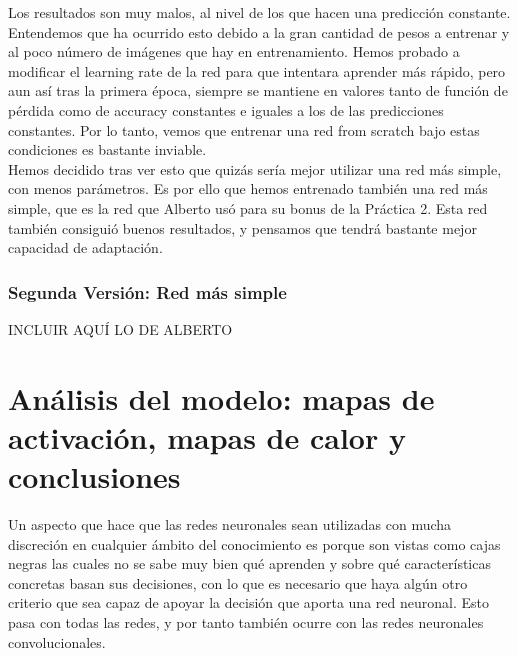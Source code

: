\documentclass[11pt,a4paper]{article}
\theoremstyle{definition}
\begin{document}
Los resultados son muy malos, al nivel de los que hacen una predicción constante.  Entendemos que ha ocurrido esto debido a la gran cantidad de pesos a entrenar y al poco número de imágenes que hay en entrenamiento.  Hemos probado a modificar el learning rate de la red para que intentara aprender más rápido, pero aun así tras la primera época,  siempre se mantiene en valores tanto de función de pérdida como de accuracy constantes e iguales a los de las predicciones constantes. Por lo tanto, vemos que entrenar una red from scratch bajo estas condiciones es bastante inviable.\\

Hemos decidido tras ver esto que quizás sería mejor utilizar una red más simple, con menos parámetros.  Es por ello que hemos entrenado también una red más simple, que es la red que Alberto usó para su bonus de la Práctica 2. Esta red también consiguió buenos resultados,  y pensamos que tendrá bastante mejor capacidad de adaptación.

\subsubsection{Segunda Versión: Red más simple}

INCLUIR AQUÍ LO DE ALBERTO

\section{Análisis del modelo: mapas de activación, mapas de calor y conclusiones}

Un aspecto que hace que las redes neuronales sean utilizadas con mucha discreción en cualquier ámbito del conocimiento es porque son vistas como cajas negras las cuales no se sabe muy bien qué aprenden y sobre qué características concretas basan sus decisiones, con lo que es necesario que haya algún otro criterio que sea capaz de apoyar la decisión que aporta una red neuronal. Esto pasa con todas las redes, y por tanto también ocurre con las redes neuronales convolucionales. \\
\end{document}
